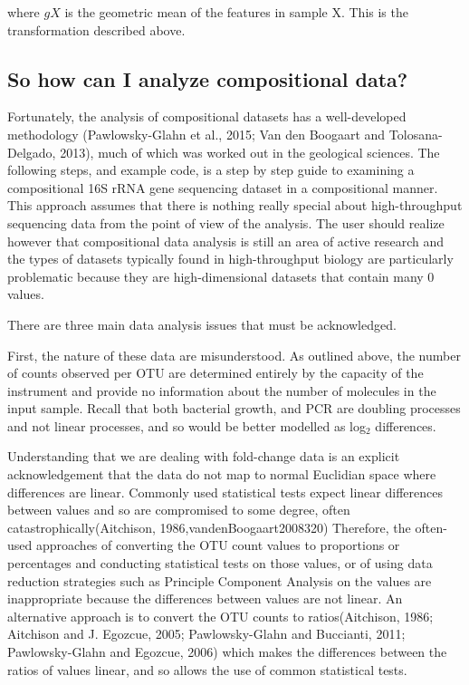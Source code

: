 \documentclass[twocolumn]{article}
\begin{document}
where \(gX\) is the geometric mean of the features in sample X. This is
the transformation described above.

\subsection{So how can I analyze compositional
data?}\label{so-how-can-i-analyze-compositional-data}

Fortunately, the analysis of compositional datasets has a well-developed
methodology (Pawlowsky-Glahn et al., 2015; Van den Boogaart and
Tolosana-Delgado, 2013), much of which was worked out in the geological
sciences. The following steps, and example code, is a step by step guide
to examining a compositional 16S rRNA gene sequencing dataset in a
compositional manner. This approach assumes that there is nothing really
special about high-throughput sequencing data from the point of view of
the analysis. The user should realize however that compositional data
analysis is still an area of active research and the types of datasets
typically found in high-throughput biology are particularly problematic
because they are high-dimensional datasets that contain many 0 values.

There are three main data analysis issues that must be acknowledged.

First, the nature of these data are misunderstood. As outlined above,
the number of counts observed per OTU are determined entirely by the
capacity of the instrument and provide no information about the number
of molecules in the input sample. Recall that both bacterial growth, and
PCR are doubling processes and not linear processes, and so would be
better modelled as log\(_2\) differences.

Understanding that we are dealing with fold-change data is an explicit
acknowledgement that the data do not map to normal Euclidian space where
differences are linear. Commonly used statistical tests expect linear
differences between values and so are compromised to some degree, often
catastrophically(Aitchison, 1986,vandenBoogaart2008320) Therefore, the
often-used approaches of converting the OTU count values to proportions
or percentages and conducting statistical tests on those values, or of
using data reduction strategies such as Principle Component Analysis on
the values are inappropriate because the differences between values are
not linear. An alternative approach is to convert the OTU counts to
ratios(Aitchison, 1986; Aitchison and J. Egozcue, 2005; Pawlowsky-Glahn
and Buccianti, 2011; Pawlowsky-Glahn and Egozcue, 2006) which makes the
differences between the ratios of values linear, and so allows the use
of common statistical tests.
\end{document}

